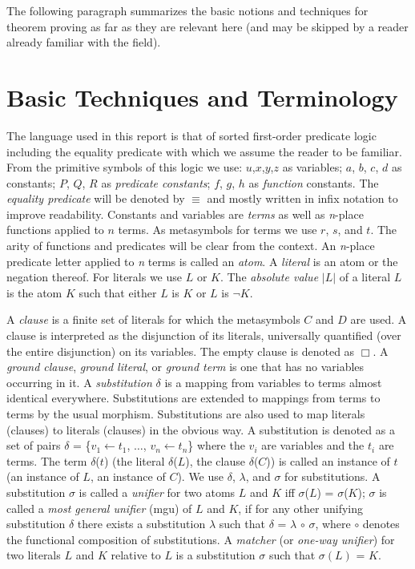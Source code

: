 The following paragraph summarizes the basic notions and techniques
for theorem proving as far as they are relevant here (and may be
skipped by a reader already familiar with the field).


\section{Basic Techniques and Terminology}
\label {BasicTechniquesandTerminology}

The language used in this report is that of sorted first-order predicate 
logic including the equality predicate with which we assume the reader 
to be familiar. From the primitive symbols of this logic we use:
$u$,$x$,$y$,$z$ as variables; $a$, $b$, $c$, $d$ 
as constants; $P$, $Q$, $R$ as {\em predicate constants\/}; $f$, $g$, $h$ as 
{\em function\/} constants. The {\em equality predicate\/} 
will be denoted by $\equiv$ and mostly written in infix notation to 
improve readability. Constants and variables are {\em terms\/} as well as 
{\em n\/}-place functions applied to $n$ terms. As metasymbols for 
terms we use $r$, $s$, and $t$. The arity of functions and predicates 
will be clear from the context. An {\em n\/}-place 
predicate letter applied to {\em n\/} terms is called an {\em atom\/}. 
A {\em literal\/} is an atom or the negation thereof. For literals we 
use $L$ or $K$. The {\em absolute value\/} $|L|$ of a literal $L$ is 
the atom $K$ such that either $L$ is $K$ or $L$ is $\neg K$.

A {\em clause\/}  is a finite set of literals for which
the metasymbols $C$ and $D$ are used. A clause is interpreted as the
disjunction of its literals, universally quantified (over the entire
disjunction) on its variables. The empty clause is denoted as $\Box$.
A {\em ground clause\/}, {\em ground literal\/}, or {\em ground
term\/} is one that has no variables occurring in it. A
 {\em substitution\/} $\delta$ is a mapping from
variables to terms almost identical everywhere. Substitutions are
extended to mappings from terms to terms by the usual morphism.
Substitutions are also used to map literals (clauses) to literals
(clauses) in the obvious way. A substitution is denoted as a set of
pairs $\delta$ = \{$v_1 \leftarrow t_1$, $\dots$, $v_n \leftarrow
t_n$\} where the $v_i$ are variables and the $t_i$ are terms. The term
$\delta$($t$) (the literal $\delta$($L$), the clause $\delta$($C$)) is
called an instance of $t$ (an instance of $L$, an instance of $C$). We
use $\delta$, $\lambda$, and $\sigma$ for substitutions. A
substitution $\sigma$ is called a {\em unifier\/} for two atoms $L$
and $K$ iff $\sigma$($L$) = $\sigma$($K$); $\sigma$ is called a {\em
most general unifier\/} (mgu) of $L$ and $K$, if for any other
unifying substitution $\delta$ there exists a substitution $\lambda$
such that $\delta$ = $\lambda$ $\circ$ $\sigma$, where $\circ$ denotes
the functional composition of substitutions. A {\em matcher\/} (or
{\em one-way unifier\/}) for two literals $L$ and $K$ relative to $L$
is a substitution $\sigma$ such that $\sigma(L)$ = $K$.

